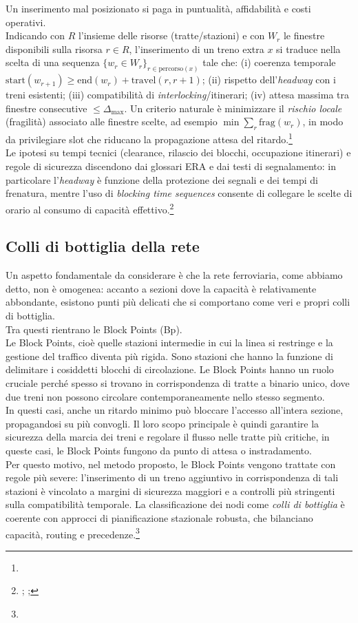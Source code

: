 \documentclass{report}
\newcommand{\fnShort}[2][]{\footnote{\footshorthand[#1]{#2}}}
\begin{document}
Un inserimento mal posizionato si paga in puntualità, affidabilità e costi operativi. \\ Indicando con $R$ l’insieme delle risorse (tratte/stazioni) e con $W_r$ le finestre disponibili sulla risorsa $r\in R$, l’inserimento di un treno extra $x$ si traduce nella scelta di una sequenza $\{w_r\in W_r\}_{r\in \text{percorso}(x)}$ tale che: (i) coerenza temporale $\text{start}(w_{r+1}) \ge \text{end}(w_r)+\text{travel}(r,r{+}1)$; (ii) rispetto dell’\emph{headway} con i treni esistenti; (iii) compatibilità di \emph{interlocking}/itinerari; (iv) attesa massima tra finestre consecutive $\le \Delta_{\max}$. Un criterio naturale è minimizzare il \emph{rischio locale} (fragilità) associato alle finestre scelte, ad esempio $\min \sum_{r} \text{frag}(w_r)$, in modo da privilegiare slot che riducano la propagazione attesa del ritardo.\fnShort{CacchianiToth2012} \\ Le ipotesi su tempi tecnici (clearance, rilascio dei blocchi, occupazione itinerari) e regole di sicurezza discendono dai glossari ERA e dai testi di segnalamento: in particolare l’\emph{headway} è funzione della protezione dei segnali e dei tempi di frenatura, mentre l’uso di \emph{blocking time sequences} consente di collegare le scelte di orario al consumo di capacità effettivo.\footnote{; ; }




\subsection{Colli di bottiglia della rete}
Un aspetto fondamentale da considerare è che la rete ferroviaria, come abbiamo detto, non è omogenea: accanto a sezioni dove la capacità è relativamente abbondante, esistono punti più delicati che si comportano come veri e propri colli di bottiglia.\\ Tra questi rientrano le Block Points (Bp).\\  Le Block Points, cioè quelle stazioni intermedie in cui la linea si restringe e la gestione del traffico diventa più rigida. 
Sono stazioni che hanno la funzione di delimitare i cosiddetti blocchi di circolazione.
Le Block Points hanno un ruolo cruciale perché spesso si trovano in corrispondenza di tratte a binario unico, dove due treni non possono circolare contemporaneamente nello stesso segmento. \\ In questi casi, anche un ritardo minimo può bloccare l’accesso all’intera sezione, propagandosi su più convogli.
Il loro scopo principale è quindi garantire la sicurezza della marcia dei treni e regolare il flusso nelle tratte più critiche, in queste casi, le Block Points fungono da punto di attesa o instradamento.\\
Per questo motivo, nel metodo proposto, le Block Points vengono trattate con regole più severe: l’inserimento di un treno aggiuntivo in corrispondenza di tali stazioni è vincolato a margini di sicurezza maggiori e a controlli più stringenti sulla compatibilità temporale. La classificazione dei nodi come \emph{colli di bottiglia} è coerente con approcci di pianificazione stazionale robusta, che bilanciano capacità, routing e precedenze.\fnShort{Dewilde2013}
\end{document}

